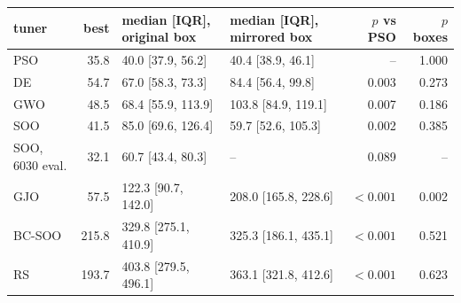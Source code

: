\begin{tabular}{lrllrr}
\toprule
tuner & best & median [IQR], original box & median [IQR], mirrored box & $p$ vs PSO & $p$ boxes \\
\midrule
PSO & 35.8 & 40.0 [37.9, 56.2] & 40.4 [38.9, 46.1] & -- & 1.000 \\
DE & 54.7 & 67.0 [58.3, 73.3] & 84.4 [56.4, 99.8] & 0.003 & 0.273 \\
GWO & 48.5 & 68.4 [55.9, 113.9] & 103.8 [84.9, 119.1] & 0.007 & 0.186 \\
SOO & 41.5 & 85.0 [69.6, 126.4] & 59.7 [52.6, 105.3] & 0.002 & 0.385 \\
SOO, 6030 eval. & 32.1 & 60.7 [43.4, 80.3] & -- & 0.089 & -- \\
GJO & 57.5 & 122.3 [90.7, 142.0] & 208.0 [165.8, 228.6] & $<0.001$ & 0.002 \\
BC-SOO & 215.8 & 329.8 [275.1, 410.9] & 325.3 [186.1, 435.1] & $<0.001$ & 0.521 \\
RS & 193.7 & 403.8 [279.5, 496.1] & 363.1 [321.8, 412.6] & $<0.001$ & 0.623 \\
\bottomrule
\end{tabular}
